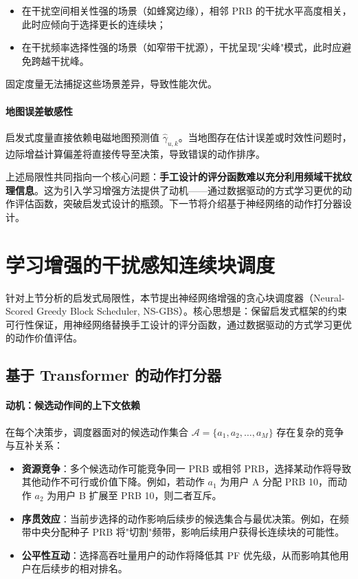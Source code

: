\documentclass[type=master]{fduthesis}
\begin{document}
\begin{itemize}
\item 在干扰空间相关性强的场景（如蜂窝边缘），相邻 PRB 的干扰水平高度相关，此时应倾向于选择更长的连续块；
\item 在干扰频率选择性强的场景（如窄带干扰源），干扰呈现"尖峰"模式，此时应避免跨越干扰峰。
\end{itemize}

固定度量无法捕捉这些场景差异，导致性能次优。

\paragraph{地图误差敏感性}
启发式度量直接依赖电磁地图预测值 $\hat{\gamma}_{u,k}$。当地图存在估计误差或时效性问题时，边际增益计算偏差将直接传导至决策，导致错误的动作排序。

上述局限性共同指向一个核心问题：\textbf{手工设计的评分函数难以充分利用频域干扰纹理信息}。这为引入学习增强方法提供了动机——通过数据驱动的方式学习更优的动作评估函数，突破启发式设计的瓶颈。下一节将介绍基于神经网络的动作打分器设计。

\section{学习增强的干扰感知连续块调度}
\label{sec:ch4_nsgbs}

针对上节分析的启发式局限性，本节提出神经网络增强的贪心块调度器（Neural-Scored Greedy Block Scheduler, NS-GBS）。核心思想是：保留启发式框架的约束可行性保证，用神经网络替换手工设计的评分函数，通过数据驱动的方式学习更优的动作价值评估。

\subsection{基于 Transformer 的动作打分器}
\label{subsec:ch4_transformer_scorer}

\paragraph{动机：候选动作间的上下文依赖}
在每个决策步，调度器面对的候选动作集合 $\mathcal{A} = \{a_1, a_2, \ldots, a_M\}$ 存在复杂的竞争与互补关系：

\begin{itemize}
\item \textbf{资源竞争}：多个候选动作可能竞争同一 PRB 或相邻 PRB，选择某动作将导致其他动作不可行或价值下降。例如，若动作 $a_1$ 为用户 A 分配 PRB 10，而动作 $a_2$ 为用户 B 扩展至 PRB 10，则二者互斥。

\item \textbf{序贯效应}：当前步选择的动作影响后续步的候选集合与最优决策。例如，在频带中央分配种子 PRB 将"切割"频带，影响后续用户获得长连续块的可能性。

\item \textbf{公平性互动}：选择高吞吐量用户的动作将降低其 PF 优先级，从而影响其他用户在后续步的相对排名。
\end{itemize}
\end{document}
